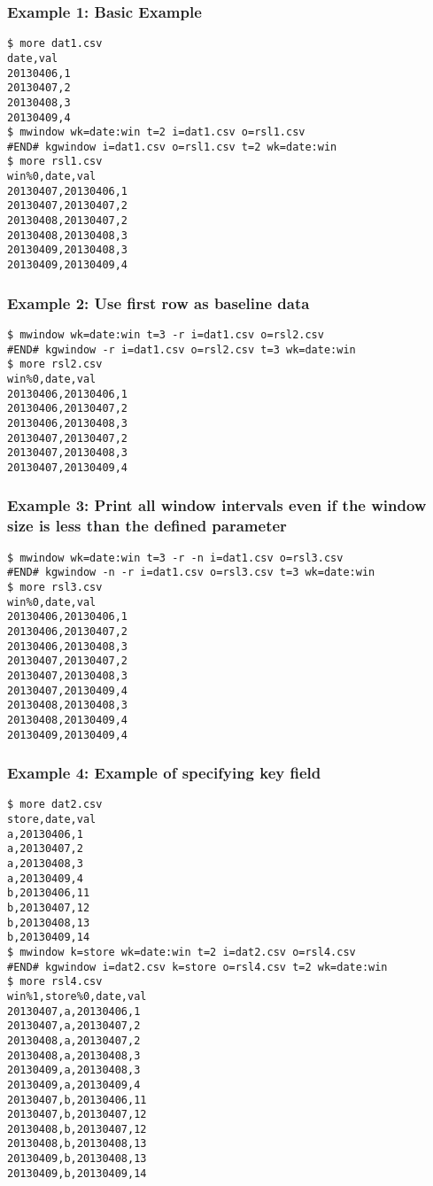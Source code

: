 \subsubsection*{Example 1: Basic Example}



\begin{Verbatim}[baselinestretch=0.7,frame=single]
$ more dat1.csv
date,val
20130406,1
20130407,2
20130408,3
20130409,4
$ mwindow wk=date:win t=2 i=dat1.csv o=rsl1.csv
#END# kgwindow i=dat1.csv o=rsl1.csv t=2 wk=date:win
$ more rsl1.csv
win%0,date,val
20130407,20130406,1
20130407,20130407,2
20130408,20130407,2
20130408,20130408,3
20130409,20130408,3
20130409,20130409,4
\end{Verbatim}
\subsubsection*{Example 2: Use first row as baseline data}



\begin{Verbatim}[baselinestretch=0.7,frame=single]
$ mwindow wk=date:win t=3 -r i=dat1.csv o=rsl2.csv
#END# kgwindow -r i=dat1.csv o=rsl2.csv t=3 wk=date:win
$ more rsl2.csv
win%0,date,val
20130406,20130406,1
20130406,20130407,2
20130406,20130408,3
20130407,20130407,2
20130407,20130408,3
20130407,20130409,4
\end{Verbatim}
\subsubsection*{Example 3: Print all window intervals even if the window size is less than the defined parameter}



\begin{Verbatim}[baselinestretch=0.7,frame=single]
$ mwindow wk=date:win t=3 -r -n i=dat1.csv o=rsl3.csv
#END# kgwindow -n -r i=dat1.csv o=rsl3.csv t=3 wk=date:win
$ more rsl3.csv
win%0,date,val
20130406,20130406,1
20130406,20130407,2
20130406,20130408,3
20130407,20130407,2
20130407,20130408,3
20130407,20130409,4
20130408,20130408,3
20130408,20130409,4
20130409,20130409,4
\end{Verbatim}
\subsubsection*{Example 4: Example of specifying key field}



\begin{Verbatim}[baselinestretch=0.7,frame=single]
$ more dat2.csv
store,date,val
a,20130406,1
a,20130407,2
a,20130408,3
a,20130409,4
b,20130406,11
b,20130407,12
b,20130408,13
b,20130409,14
$ mwindow k=store wk=date:win t=2 i=dat2.csv o=rsl4.csv
#END# kgwindow i=dat2.csv k=store o=rsl4.csv t=2 wk=date:win
$ more rsl4.csv
win%1,store%0,date,val
20130407,a,20130406,1
20130407,a,20130407,2
20130408,a,20130407,2
20130408,a,20130408,3
20130409,a,20130408,3
20130409,a,20130409,4
20130407,b,20130406,11
20130407,b,20130407,12
20130408,b,20130407,12
20130408,b,20130408,13
20130409,b,20130408,13
20130409,b,20130409,14
\end{Verbatim}

